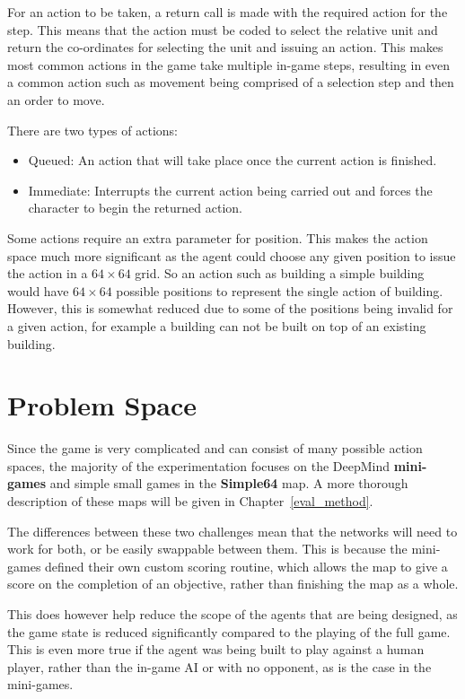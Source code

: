 For an action to be taken, a return call is made with the required action for
the step. This means that the action must be coded to select the relative unit
and return the co-ordinates for selecting the unit and issuing an action. This
makes most common actions in the game take multiple in-game steps, resulting in
even a common action such as movement being comprised of a selection step and
then an order to move.

There are two types of actions:

\begin{itemize}
    \item Queued: An action that will take place once the current
        action is finished.
    \item Immediate: Interrupts the current action being carried out and
        forces the character to begin the returned action.
\end{itemize}

Some actions require an extra parameter for position. This makes the action
space much more significant as the agent could choose any given position to
issue the action in a $64 \times 64$ grid. So an action such as building a
simple building would have $64 \times 64$ possible positions to represent the
single action of building. However, this is somewhat reduced due to some of the
positions being invalid for a given action, for example a building can not be
built on top of an existing building.

\section{Problem Space}
Since the game is very complicated and can consist of many possible action spaces,
the majority of the experimentation focuses on the DeepMind \textbf{mini-games}
and simple small games in the \textbf{Simple64} map. A more thorough description
of these maps will be given in Chapter~\ref{eval_method}.

The differences between these two challenges mean that the networks will need to
work for both, or be easily swappable between them. This is because the
mini-games defined their own custom scoring routine, which allows the map to
give a score on the completion of an objective, rather than finishing the map as
a whole.

This does however help reduce the scope of the agents that are being designed,
as the game state is reduced significantly compared to the playing of the full
game. This is even more true if the agent was being built to play against a
human player, rather than the in-game AI or with no opponent, as is the case in
the mini-games.

